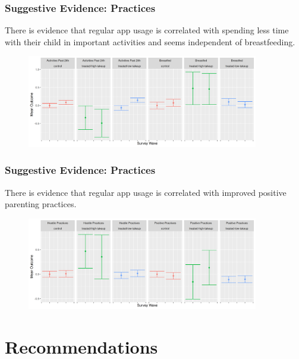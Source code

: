 \documentclass[aspectratio=169]{beamer}
\begin{document}
\begin{frame}
 \frametitle{Suggestive Evidence: Practices}
There is evidence that regular app usage is correlated with spending less time with their child in important activities and seems independent of breastfeeding. 

\begin{figure}[H]
  \centering
\includegraphics[width=0.9\textwidth]{../plots/pre_post/Pooled: Breastfed.png}
\label{fig:practices-pre-post}
\end{figure}
   
\end{frame}


\begin{frame}
 \frametitle{Suggestive Evidence: Practices}

There is evidence that regular app usage is correlated with improved positive parenting practices. 
\begin{figure}[H]
  \centering
\includegraphics[width=0.9\textwidth]{../plots/pre_post/Pooled: Positive Practices.png}
\label{fig:practices-pre-post}
\end{figure}
   
\end{frame}


\section{Recommendations}
\end{document}
